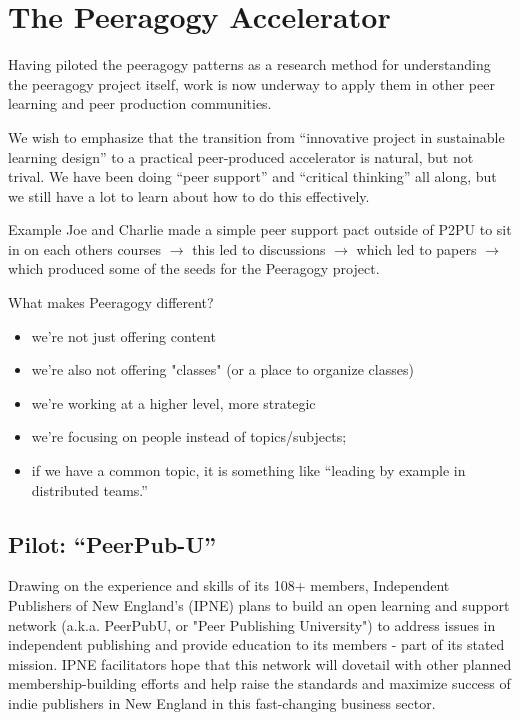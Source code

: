 \documentclass{acm_proc_article-sp}
\begin{document}
\section{The Peeragogy Accelerator} \label{accelerator}

Having piloted the peeragogy patterns as a research method for
understanding the peeragogy project itself, work is now underway to
apply them in other peer learning and peer production communities.

We wish to emphasize that the transition from ``innovative project in sustainable learning design'' to a practical peer-produced accelerator is natural, but not trival.   We have been doing ``peer
support'' and ``critical thinking'' all along, but we still have a lot to learn about how to do this effectively.

\begin{paragraph}{Example}
Joe and Charlie made a simple peer support pact outside of P2PU to sit
in on each others courses $\rightarrow$ this led to discussions $\rightarrow$ which led to papers $\rightarrow$ which produced some of the seeds for the Peeragogy project.
\end{paragraph}

\begin{paragraph}{What makes Peeragogy different?}
\begin{itemize}
\item we're not just offering content
\item we're also not offering "classes" (or a place to organize classes)
\item we're working at a higher level, more strategic
\item we're focusing on people instead of topics/subjects;
\item if we have a common topic, it is something like ``leading by example in distributed teams.''
\end{itemize}
\end{paragraph}

\subsection{Pilot: ``PeerPub-U''}

Drawing on the experience and skills of its 108+ members, Independent
Publishers of New England's (IPNE) plans to build an open learning and support network (a.k.a. PeerPubU, or "Peer Publishing University") to address issues in independent publishing and provide education to its members - part of its stated mission. IPNE facilitators hope that this network will dovetail with other planned membership-building efforts and help raise the standards and maximize success of indie publishers in New England in this fast-changing business sector.
\end{document}
